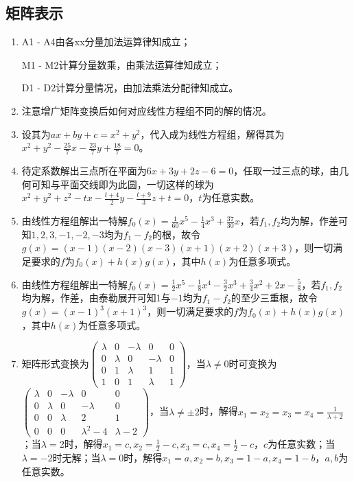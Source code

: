 \documentclass[a4paper,UTF8,fontset=windows]{ctexart}
\begin{document}
\subsection{矩阵表示}
\begin{enumerate}
\item
A1 - A4由各xx分量加法运算律知成立；

M1 - M2计算分量数乘，由乘法运算律知成立；

D1 - D2计算分量情况，由加法乘法分配律知成立。

\item
注意增广矩阵变换后如何对应线性方程组不同的解的情况。

\item
设其为$ax+by+c=x^2+y^2$，代入成为线性方程组，解得其为$x^2+y^2-\frac{25}{7}x-\frac{23}{7}y+\frac{18}{7}=0$。

\item
待定系数解出三点所在平面为$6x+3y+2z-6=0$，任取一过三点的球，由几何可知与平面交线即为此圆，一切这样的球为$x^2+y^2+z^2-tx-\frac{t+4}{2}y-\frac{t+9}{3}z+t=0$，$t$为任意实数。

\item
由线性方程组解出一特解$f_0(x)=\frac{1}{60}x^5-\frac{1}{4}x^3+\frac{37}{30}x$，若$f_1,f_2$均为解，作差可知$1,2,3,-1,-2,-3$均为$f_1-f_2$的根，故令$g(x)=(x-1)(x-2)(x-3)(x+1)(x+2)(x+3)$，则一切满足要求的$f$为$f_0(x)+h(x)g(x)$，其中$h(x)$为任意多项式。

\item
由线性方程组解出一特解$f_0(x)=\frac{1}{2}x^5-\frac{1}{8}x^4-\frac{3}{2}x^3+\frac{3}{4}x^2+2x-\frac{5}{8}$，若$f_1,f_2$均为解，作差，由泰勒展开可知1与$-1$均为$f_1-f_2$的至少三重根，故令$g(x)=(x-1)^3(x+1)^3$，则一切满足要求的$f$为$f_0(x)+h(x)g(x)$，其中$h(x)$为任意多项式。

\item
矩阵形式变换为$\begin{pmatrix}\lambda&0&-\lambda&0&0\\0&\lambda&0&-\lambda&0\\0&1&\lambda&1&1\\1&0&1&\lambda&1\end{pmatrix}$，当$\lambda\ne0$时可变换为$\begin{pmatrix}\lambda&0&-\lambda&0&0\\0&\lambda&0&-\lambda&0\\0&0&\lambda&2&1\\0&0&0&\lambda^2-4&\lambda-2\end{pmatrix}$，当$\lambda\ne\pm2$时，解得$x_1=x_2=x_3=x_4=\frac{1}{\lambda+2}$；当$\lambda=2$时，解得$x_1=c,x_2=\frac{1}{2}-c,x_3=c,x_4=\frac{1}{2}-c$，$c$为任意实数；当$\lambda=-2$时无解；当$\lambda=0$时，解得$x_1=a,x_2=b,x_3=1-a,x_4=1-b$，$a,b$为任意实数。


\end{enumerate}
\end{document}

